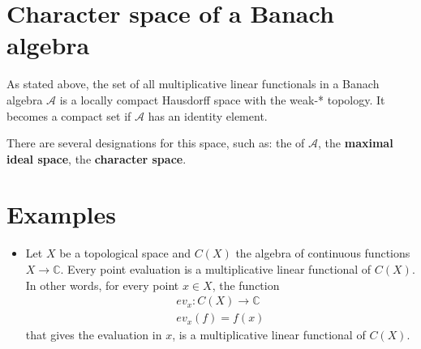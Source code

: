\documentclass[12pt]{article}
\begin{document}
\section{Character space of a Banach algebra}
As stated above, the set of all multiplicative linear functionals in a Banach algebra $\mathcal{A}$ is a locally compact Hausdorff space with the weak-* topology. It becomes a compact set if $\mathcal{A}$ has an identity element.

There are several designations for this space, such as:
 the {\bf {}} of $\mathcal{A}$, the {\bf maximal ideal space}, the {\bf character space}.

\section{Examples}
\begin{itemize}
\item Let $X$ be a topological space and $C(X)$ the algebra of continuous functions $X \longrightarrow \mathbb{C}$. Every point evaluation is a multiplicative linear functional of $C(X)$. In other words, for every point $x \in X$, the function
\begin{align*}
ev_x : C(X) \longrightarrow \mathbb{C}\\
ev_x ( f) = f(x)
\end{align*}
that gives the evaluation in $x$, is a multiplicative linear functional of $C(X)$.
\end{itemize}
\end{document}

